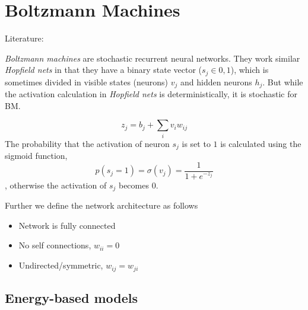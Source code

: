 \section{Boltzmann Machines}\label{sec:bm}
Literature: \cite{Bengio2009}

\emph{Boltzmann machines} are stochastic recurrent neural networks. They work similar \emph{Hopfield nets} in that they have a binary state vector ($s_j \in {0,1}$), which is sometimes divided in visible states (neurons) $v_j$ and hidden neurons $h_j$. But while the activation calculation in \emph{Hopfield nets} is deterministically, it is stochastic for \gls{BM}.

\begin{equation}
z_j = b_j + \sum_i v_i w_{ij}
\end{equation}
The probability that the activation of neuron $s_j$ is set to $1$ is calculated using the sigmoid function,
\begin{equation}
p(s_j = 1) = \sigma(v_j) = \frac{1}{1 + e^{-z_j}}
\end{equation}
, otherwise the activation of $s_j$ becomes $0$.

Further we define the network architecture as follows
\begin{itemize}
\item Network is fully connected
\item No self connections, $w_{ii}=0$
\item Undirected/symmetric, $w_{ij}=w_{ji}$
\end{itemize}

\subsection{Energy-based models}



